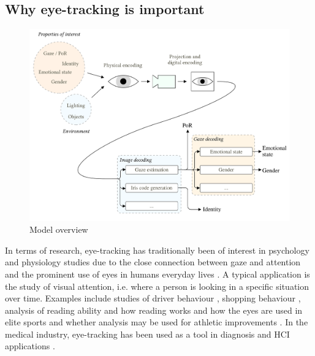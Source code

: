 \subsection{Why eye-tracking is important}
\begin{figure}
	\centering
	\includegraphics[width=1\textwidth]{figures/model/eye-tracking-model}
	\caption{Model overview}\label{fig:eye-tracking-model}
\end{figure}





In terms of research, \gls{eye-tracking} has traditionally been of interest in psychology and physiology studies due to the close connection between gaze and attention and the prominent use of eyes in humans everyday lives \parencite{duchowski2002breadth}. A typical application is the study of visual attention, i.e. where a person is looking in a specific situation over time. Examples include studies of driver behaviour \parencite{yoshizawa2017analysis}, shopping behaviour \parencite{bialkova2020desktop}, analysis of reading ability and how reading works \parencite{holsanova2006entry} and how the eyes are used in elite sports and whether analysis may be used for athletic improvements \parencite{biathlon}. In the medical industry, eye-tracking has been used as a tool in diagnosis and HCI applications \parencite{jayanthi2010automatic, holzman1974eye, galgani2009automatic}. 




